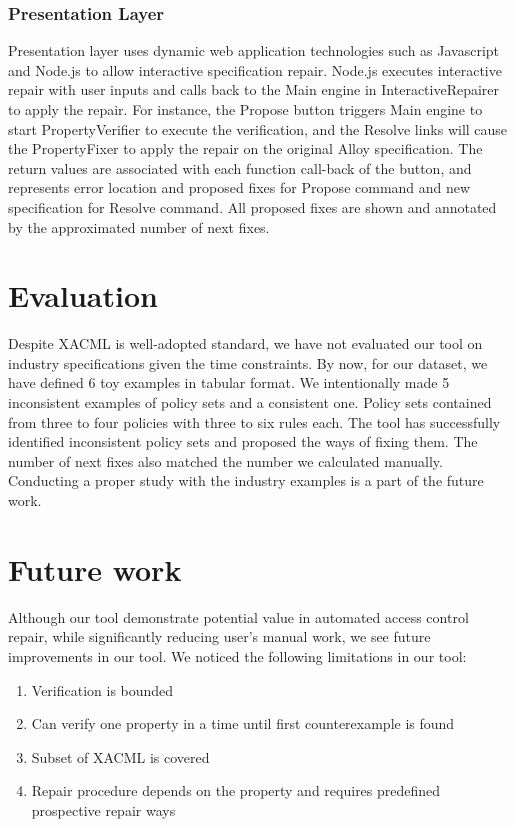 \documentclass[letterpaper]{acm_proc_article-sp}
\begin{document}
\subsubsection{Presentation Layer}
Presentation layer uses dynamic web application technologies such as Javascript and Node.js to allow interactive specification repair. Node.js executes interactive repair with user inputs and calls back to the Main engine in InteractiveRepairer to apply the repair. For instance, the Propose button triggers Main engine to start PropertyVerifier to execute the verification, and the Resolve links will cause the PropertyFixer to apply the repair on the original Alloy specification. The return values are associated with each function call-back of the button, and represents error location and proposed fixes for Propose command and new specification for Resolve command. All proposed fixes are shown and annotated by the approximated number of next fixes.

\section{Evaluation}

Despite XACML is well-adopted standard, we have not evaluated our tool on industry specifications given the time constraints. By now, for our dataset, we have defined 6 toy examples in tabular format. We intentionally made 5 inconsistent examples of policy sets and a consistent one. Policy sets contained from three to four policies with three to six rules each. The tool has successfully identified inconsistent policy sets and proposed the ways of fixing them. The number of next fixes also matched the number we calculated manually. Conducting a proper study with the industry examples is a part of the future work.

\section{Future work}

Although our tool demonstrate potential value in automated access control repair, while significantly reducing user's manual work, we see future improvements in our tool. We noticed the following limitations in our tool:

\begin{enumerate}
\item Verification is bounded
\item Can verify one property in a time until first counterexample is found
\item Subset of XACML is covered
\item Repair procedure depends on the property and requires predefined prospective repair ways
\end{enumerate}
\end{document}
